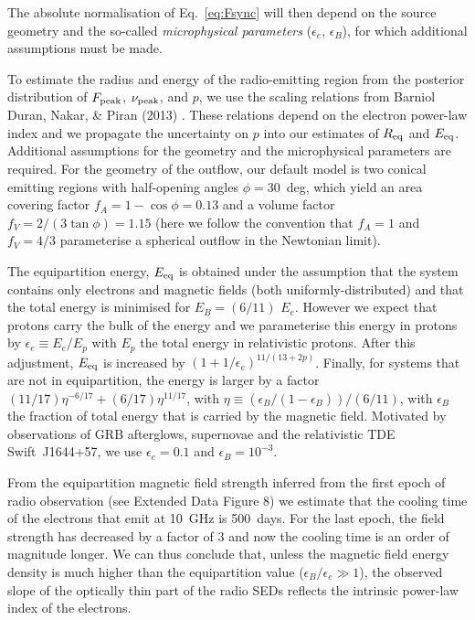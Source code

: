 The absolute normalisation of Eq.~\ref{eq:Fsync} will then depend on the source geometry and the so-called \emph{microphysical parameters} ($\epsilon_e$, $\epsilon_B$), for which additional assumptions must be made.  

To estimate the radius and energy of the radio-emitting region from the posterior distribution of $F_{ \textup{peak}}$, $\nu_{ \textup{peak}}$, and $p$, we use the scaling relations from {Barniol Duran}, {Nakar}, \& {Piran} (2013) \cite{2013ApJ...772...78B}. These relations depend on the electron power-law index and we propagate the uncertainty on $p$ into our estimates of $R_{ \textup{eq}}$ and $E_{ \textup{eq}}$. Additional assumptions for the geometry and the microphysical parameters are required. For the geometry of the outflow, our default model is two conical emitting regions with half-opening angles $\phi=$30~deg, which yield an area covering factor $f_A=1-\cos \phi=0.13$ and a volume factor $f_V=2/(3\tan \phi )=1.15$ (here we follow the convention\cite{2013ApJ...772...78B} that $f_A=1$ and $f_V=4/3$ parameterise a spherical outflow in the Newtonian limit). 

The equipartition energy, $E_{ \textup{eq}}$ is obtained under the assumption that the system contains only electrons and magnetic fields (both uniformly-distributed) and that the total energy is minimised for $E_{B} = (6/11)$ $E_{e}$. However we expect that protons carry the bulk of the energy and we parameterise this energy in protons by $\epsilon_e \equiv E_e/E_p$ with $E_p$ the total energy in relativistic protons.  After this adjustment, $E_{ \textup{eq}}$ is increased by $(1+1/\epsilon_e)^{11/(13+2p)}$. Finally, for systems that are not in equipartition, the energy is larger by a factor\cite{2013ApJ...772...78B} $(11/17) \eta^{-6/17} + (6/17) \eta^{11/17}$, with $\eta\equiv (\epsilon_B/(1-\epsilon_B))/(6/11)$, with $\epsilon_B$ the fraction of total energy that is carried by the magnetic field. Motivated by observations of GRB afterglows\cite{Granot14,Fong15}, supernovae\cite{2013MNRAS.436.1258H} and the relativistic TDE Swift~J1644+57\cite{2018ApJ...854...86E}, we use $\epsilon_e=0.1$ and $\epsilon_B=10^{-3}$. %

From the equipartition magnetic field strength inferred from the first epoch of radio observation (see Extended Data Figure 8) we estimate that the cooling time of the electrons that emit at 10~GHz is 500~days. For the last epoch, the field strength has decreased by a factor of 3 and now the cooling time is an order of magnitude longer. We can thus conclude that, unless the magnetic field energy density is much higher than the equipartition value ($\epsilon_B/\epsilon_e\gg1$), the observed slope of the optically thin part of the radio SEDs reflects the intrinsic power-law index of the electrons. 

